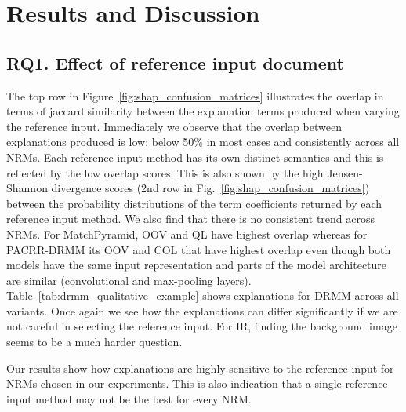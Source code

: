 \section{Results and Discussion}
\label{sec:lime_shap_results}

\subsection{RQ1. Effect of reference input document} \label{sec:interpretability_rq1}

The top row in Figure~\ref{fig:shap_confusion_matrices} illustrates the overlap in terms of jaccard similarity between the explanation terms produced when varying the reference input. Immediately we observe that the overlap between explanations produced is low; below 50\% in most cases and consistently across all NRMs. Each reference input method has its own distinct semantics and this is reflected by the low overlap scores. This is also shown by the high Jensen-Shannon divergence scores (2nd row in Fig.~\ref{fig:shap_confusion_matrices}) between the probability distributions of the term coefficients returned by each reference input method. We also find that there is no consistent trend across NRMs. For MatchPyramid, \textsf{OOV} and \textsf{QL} have highest overlap whereas for PACRR-DRMM its \textsf{OOV} and \textsf{COL} that have highest overlap even though both models have the same input representation and parts of the model architecture are similar (convolutional and max-pooling layers). Table~\ref{tab:drmm_qualitative_example} shows explanations for DRMM across all variants. Once again we see how the explanations can differ significantly if we are not careful in selecting the reference input. For IR, finding the background image seems to be a much harder question. 

Our results show how explanations are highly sensitive to the reference input for NRMs chosen in our experiments. This is also indication that a single reference input method may not be the best for every NRM. 

